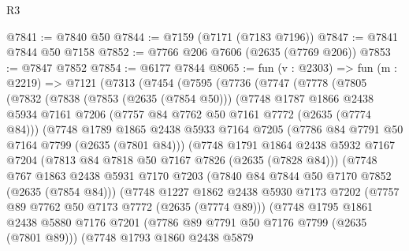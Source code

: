 \begin{lexlean}{R3}
\begin{coremodule}
@7841 := @7840 @50
@7844 := @7159 (@7171 (@7183 @7196))
@7847 := @7841 @7844 @50 @7158
@7852 := @7766 @206 @7606 (@2635 (@7769 @206))
@7853 := @7847 @7852
@7854 := @6177 @7844
@8065 := fun (v : @2303) =>
  fun (m : @2219) =>
  @7121
    (@7313
      (@7454
        (@7595
          (@7736
            (@7747
              (@7778
                (@7805
                  (@7832
                    (@7838
                      (@7853 (@2635 (@7854 @50)))
                      (@7748
                        @1787
                        @1866
                        @2438
                        @5934
                        @7161
                        @7206
                        (@7757 @84 @7762 @50 @7161 @7772 (@2635 (@7774 @84)))
                        (@7748
                          @1789
                          @1865
                          @2438
                          @5933
                          @7164
                          @7205
                          (@7786 @84 @7791 @50 @7164 @7799 (@2635 (@7801 @84)))
                          (@7748
                            @1791
                            @1864
                            @2438
                            @5932
                            @7167
                            @7204
                            (@7813 @84 @7818 @50 @7167 @7826 (@2635 (@7828 @84)))
                            (@7748
                              @767
                              @1863
                              @2438
                              @5931
                              @7170
                              @7203
                              (@7840 @84 @7844 @50 @7170 @7852 (@2635 (@7854 @84)))
                              (@7748
                                @1227
                                @1862
                                @2438
                                @5930
                                @7173
                                @7202
                                (@7757 @89 @7762 @50 @7173 @7772 (@2635 (@7774 @89)))
                                (@7748
                                  @1795
                                  @1861
                                  @2438
                                  @5880
                                  @7176
                                  @7201
                                  (@7786 @89 @7791 @50 @7176 @7799 (@2635 (@7801 @89)))
                                  (@7748
                                    @1793
                                    @1860
                                    @2438
                                    @5879

\end{coremodule}
\end{lexlean}

